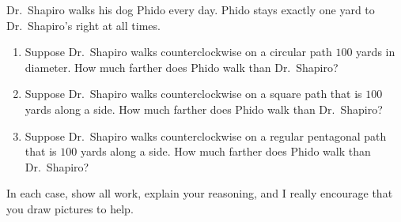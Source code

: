 \documentclass[noauthor,hints,nooutcomes,handout]{ximera}
\begin{document}
\begin{question} %

 
Dr.\ Shapiro walks his dog Phido every day. Phido stays exactly one
yard to Dr.\ Shapiro's right at all times.

\begin{enumerate}
\item Suppose Dr.\ Shapiro walks counterclockwise on a circular path
  $100$ yards in diameter. How much farther does Phido walk than
  Dr.\ Shapiro? 
\item Suppose Dr.\ Shapiro walks counterclockwise on a square path
  that is $100$ yards along a side.  How much farther does Phido walk than
  Dr.\ Shapiro? 
\item Suppose Dr.\ Shapiro walks counterclockwise on a regular
  pentagonal path that is $100$ yards along a side.  How much farther does Phido walk than
  Dr.\ Shapiro? 
\end{enumerate}
In each case, show all work, explain your reasoning, and I really
encourage that you draw pictures to help.


\end{question}
\end{document}
